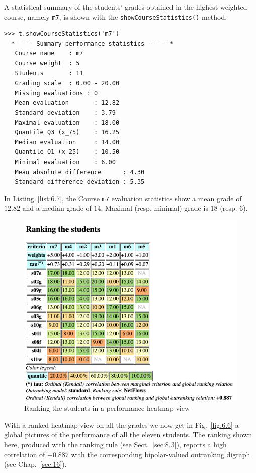 A statistical summary of the students' grades obtained in the highest weighted course, namely \texttt{m7}, is shown with the \texttt{showCourseStatistics()} method. 
\begin{lstlisting}[caption={Student performance summary statistics per course},label=list:6.7]
>>> t.showCourseStatistics('m7')
  *----- Summary performance statistics ------*
   Course name    : m7
   Course weight  : 5
   Students       : 11
   Grading scale  : 0.00 - 20.00
   Missing evaluations : 0
   Mean evaluation       : 12.82
   Standard deviation    : 3.79
   Maximal evaluation    : 18.00
   Quantile Q3 (x_75)    : 16.25
   Median evaluation     : 14.00
   Quantile Q1 (x_25)    : 10.50
   Minimal evaluation    : 6.00
   Mean absolute difference      : 4.30
   Standard difference deviation : 5.35
\end{lstlisting}

In Listing~\vref{list:6.7}, the Course \texttt{m7} evaluation statistics show a mean grade of $12.82$ and a median grade of $14$. Maximal (resp. minimal) grade is $18$ (resp. $6$).

\begin{figure}[ht]
\includegraphics[width=0.9\hsize]{Figures/6-6-rankingStudents.png}
\caption{Ranking the students in a performance heatmap view}
\label{fig:6.6}       %
\end{figure}
With a ranked heatmap view on all the grades we now get in Fig.~\vref{fig:6.6} a global pictures of the performance of all the eleven students. The ranking shown here, produced with the \NetFlows ranking rule (see Sect.~\ref{sec:8.3}), reports a high correlation of $+0.887$ with the corresponding bipolar-valued outranking digraph (see Chap.~\ref{sec:16}).

